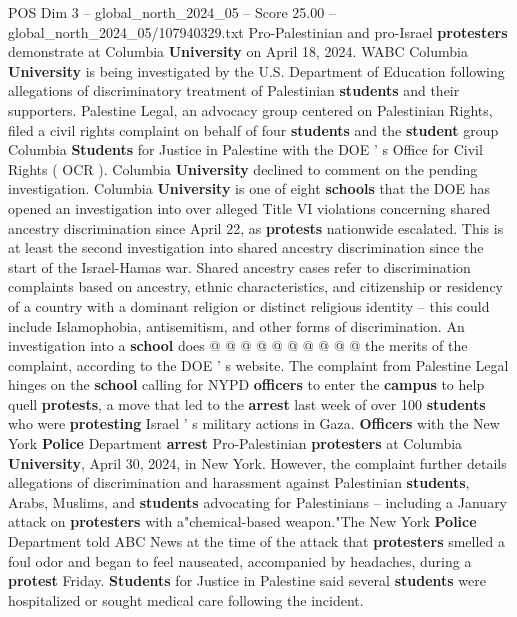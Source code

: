 \begin{textsample}{POS Dim 3 – global\_north\_2024\_05 – Score 25.00 – global\_north\_2024\_05/107940329.txt}  \label{ex:f3_pos_002}
Pro-Palestinian and pro-Israel \textbf{protesters} demonstrate at Columbia \textbf{University} on April 18, 2024.
WABC Columbia \textbf{University} is being investigated by the U.S.
Department of Education following allegations of discriminatory treatment of Palestinian \textbf{students} and their supporters.
Palestine Legal, an advocacy group centered on Palestinian Rights, filed a civil rights complaint on behalf of four \textbf{students} and the \textbf{student} group Columbia \textbf{Students} for Justice in Palestine with the DOE ' s Office for Civil Rights ( OCR ).
Columbia \textbf{University} declined to comment on the pending investigation.
Columbia \textbf{University} is one of eight \textbf{schools} that the DOE has opened an investigation into over alleged Title VI violations concerning shared ancestry discrimination since April 22, as \textbf{protests} nationwide escalated.
This is at least the second investigation into shared ancestry discrimination since the start of the Israel-Hamas war.
Shared ancestry cases refer to discrimination complaints based on ancestry, ethnic characteristics, and citizenship or residency of a country with a dominant religion or distinct religious identity -- this could include Islamophobia, antisemitism, and other forms of discrimination.
An investigation into a \textbf{school} does @ @ @ @ @ @ @ @ @ @ the merits of the complaint, according to the DOE ' s website.
The complaint from Palestine Legal hinges on the \textbf{school} calling for NYPD \textbf{officers} to enter the \textbf{campus} to help quell \textbf{protests}, a move that led to the \textbf{arrest} last week of over 100 \textbf{students} who were \textbf{protesting} Israel ' s military actions in Gaza. \textbf{Officers} with the New York \textbf{Police} Department \textbf{arrest} Pro-Palestinian \textbf{protesters} at Columbia \textbf{University}, April 30, 2024, in New York.
However, the complaint further details allegations of discrimination and harassment against Palestinian \textbf{students}, Arabs, Muslims, and \textbf{students} advocating for Palestinians -- including a January attack on \textbf{protesters} with a"chemical-based weapon."The New York \textbf{Police} Department told ABC News at the time of the attack that \textbf{protesters} smelled a foul odor and began to feel nauseated, accompanied by headaches, during a \textbf{protest} Friday. \textbf{Students} for Justice in Palestine said several \textbf{students} were hospitalized or sought medical care following the incident.

\end{textsample}
